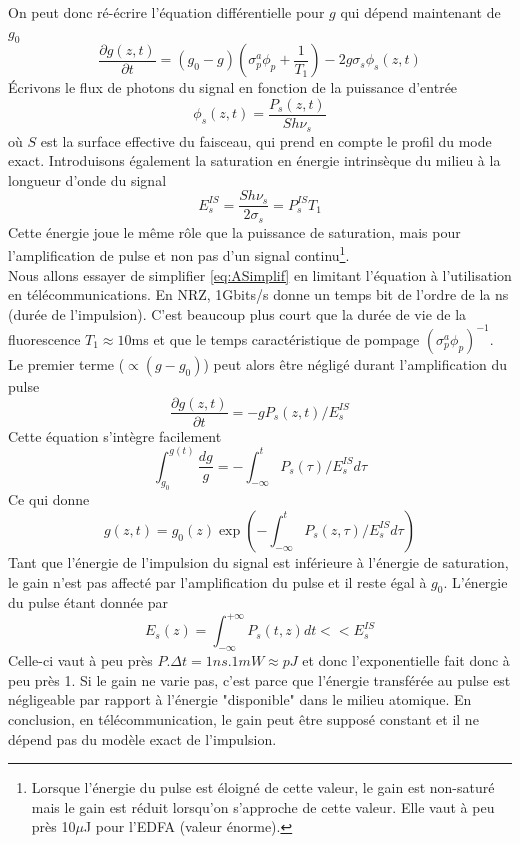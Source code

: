On peut donc ré-écrire l'équation différentielle pour $g$ qui dépend maintenant de $g_0$
\begin{equation}
\frac{{\partial g(z,t)}}{{\partial t}} = ({g_0} - g)(\sigma _p^a{\phi _p} + \frac{1}{{{T_1}}}) - 2g
\sigma _s^{}{\phi _s}(z,t)
\label{eq:ASimplif}
\end{equation}
Écrivons le flux de photons du signal en fonction de la puissance d'entrée
\begin{equation}
{\phi _s}(z,t) = \frac{{{P_s}(z,t)}}{{Sh{\nu _s}}}
\end{equation}
où $S$ est la surface effective du faisceau, qui prend en compte le profil du mode exact. Introduisons
également la saturation en énergie intrinsèque du milieu à la longueur d'onde du signal
\begin{equation}
E_s^{IS} = \frac{{Sh{\nu _s}}}{{2{\sigma _s}}} = P_s^{IS}{T_1}
\end{equation}
Cette énergie joue le même rôle que la puissance de saturation, mais pour l'amplification de pulse et
non pas d'un signal continu\footnote{Lorsque l'énergie du pulse est éloigné de cette valeur, le gain
est non-saturé mais le gain est réduit lorsqu'on s'approche de cette valeur. Elle vaut à peu près
10$\mu$J pour l'EDFA (valeur énorme).}. \\

Nous allons essayer de simplifier \eqref{eq:ASimplif} en limitant l'équation à l'utilisation en 
télécommunications. En NRZ, 1Gbits/s donne un temps bit de l'ordre de la ns (durée de l'impulsion).
C'est beaucoup plus court que la durée de vie de la fluorescence $T_1\approx 10$ms et que le 
temps caractéristique de pompage $(\sigma_p^a\phi_p)^{-1}$. Le premier terme ($\propto (g-g_0)$) 
peut alors être négligé durant l'amplification du pulse
\begin{equation}
\frac{{\partial g(z,t)}}{{\partial t}} =  - g{P_s}(z,t)/E_s^{IS}
\end{equation}
Cette équation s'intègre facilement
\begin{equation}
\int_{{g_0}}^{g(t)} {\frac{{dg}}{g}}  =  - \int_{ - \infty }^t {{P_s}(\tau )/E_s^{IS}d\tau } 
\end{equation}
Ce qui donne
\begin{equation}
g(z,t) = {g_0}(z)\exp ( - \int_{ - \infty }^t {{P_s}(z,\tau )/E_s^{IS}d\tau } )
\end{equation}
Tant que l'énergie de l'impulsion du signal est inférieure à l'énergie de saturation, le gain n'est
pas affecté par l'amplification du pulse et il reste égal à $g_0$. L'énergie du pulse étant donnée par
\begin{equation}
{E_s}(z) = \int_{ - \infty }^{ + \infty } {{P_s}(t,z)dt}  <  < E_s^{IS}
\end{equation}
Celle-ci vaut à peu près $P.\Delta t = 1ns.1mW\approx pJ$ et donc l'exponentielle fait donc à peu près 1. Si le  gain ne varie pas, c'est parce que l'énergie transférée au pulse est négligeable par rapport
à  l'énergie "disponible" dans le milieu atomique. En conclusion, en télécommunication, le gain
peut être supposé constant et il ne dépend pas du modèle exact de l'impulsion. \\

